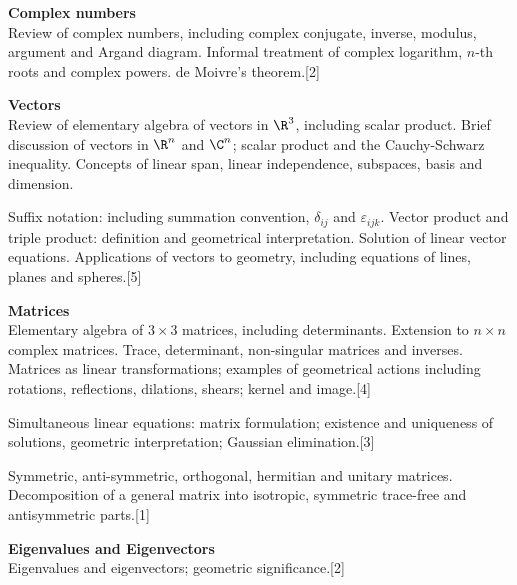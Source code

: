 \documentclass[a4paper]{article}
\begin{document}
\maketitle
{\small \noindent\textbf{Complex numbers}\\
Review of complex numbers, including complex conjugate, inverse, modulus, argument and Argand diagram. Informal treatment of complex logarithm, $n$-th roots and complex powers. de Moivre's theorem.\hspace*{\fill}[2]

\vspace{10pt}
\noindent\textbf{Vectors}\\
Review of elementary algebra of vectors in $\R^3$, including scalar product. Brief discussion of vectors in $\R^n$ and $\C^n$; scalar product and the Cauchy-Schwarz inequality. Concepts of linear span, linear independence, subspaces, basis and dimension.

\vspace{5pt}
\noindent Suffix notation: including summation convention, $\delta_{ij}$ and $\varepsilon_{ijk}$. Vector product and triple product: definition and geometrical interpretation. Solution of linear vector equations. Applications of vectors to geometry, including equations of lines, planes and spheres.\hspace*{\fill}[5]

\vspace{10pt}
\noindent\textbf{Matrices}\\
Elementary algebra of $3\times 3$ matrices, including determinants. Extension to $n\times n$ complex matrices. Trace, determinant, non-singular matrices and inverses. Matrices as linear transformations; examples of geometrical actions including rotations, reflections, dilations, shears; kernel and image.\hspace*{\fill}[4]

\vspace{5pt}
\noindent Simultaneous linear equations: matrix formulation; existence and uniqueness of solutions, geometric interpretation; Gaussian elimination.\hspace*{\fill}[3]

\vspace{5pt}
\noindent Symmetric, anti-symmetric, orthogonal, hermitian and unitary matrices. Decomposition of a general matrix into isotropic, symmetric trace-free and antisymmetric parts.\hspace*{\fill}[1]

\vspace{10pt}
\noindent\textbf{Eigenvalues and Eigenvectors}\\
Eigenvalues and eigenvectors; geometric significance.\hspace*{\fill}[2]

}
\end{document}
